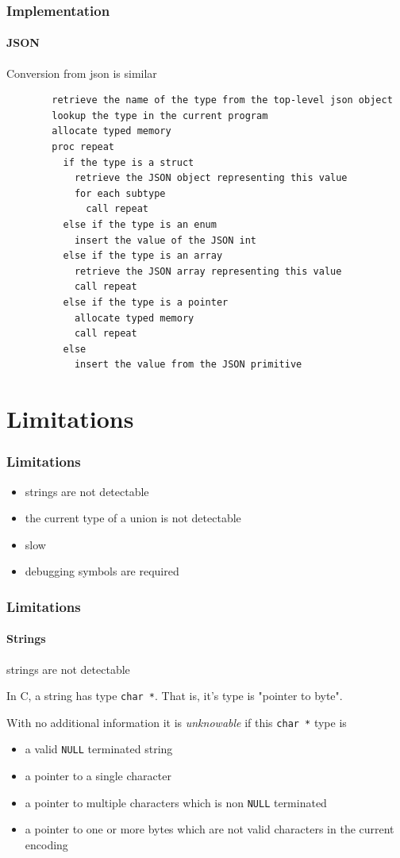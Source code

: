 \documentclass{beamer}
\begin{document}
\begin{frame}
	\frametitle{Implementation}
	\framesubtitle{JSON}

	Conversion from json is similar

	\begin{Verbatim}
		retrieve the name of the type from the top-level json object
		lookup the type in the current program
		allocate typed memory
		proc repeat
		  if the type is a struct
		    retrieve the JSON object representing this value
		    for each subtype
		      call repeat
		  else if the type is an enum
		    insert the value of the JSON int
		  else if the type is an array
		    retrieve the JSON array representing this value
		    call repeat
		  else if the type is a pointer
		    allocate typed memory
		    call repeat
		  else
		    insert the value from the JSON primitive
	\end{Verbatim}
\end{frame}

\section{Limitations}

\begin{frame}
	\frametitle{Limitations}

	\begin{itemize}
		\item strings are not detectable
		\item the current type of a union is not detectable
		\item slow
		\item debugging symbols are required
	\end{itemize}
\end{frame}

\begin{frame}
	\frametitle{Limitations}
	\framesubtitle{Strings}

	strings are not detectable

	\pause

	In C, a string has type \lstinline|char *|.
	That is, it's type is "pointer to byte".

	With no additional information it is \emph{unknowable} if this
	\lstinline|char *| type is
	
	\begin{itemize}
		\item a valid \lstinline|NULL| terminated string
		\item a pointer to a single character
		\item a pointer to multiple characters which is non \lstinline|NULL| terminated
		\item a pointer to one or more bytes which are not valid characters in the
			current encoding
	\end{itemize}
\end{frame}
\end{document}
